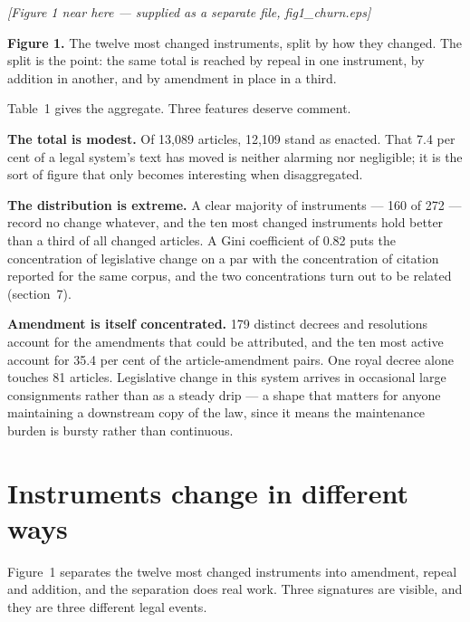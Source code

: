 \documentclass[11pt]{article}
\begin{document}
\bigskip
\noindent\textit{[Figure 1 near here --- supplied as a separate file, fig1\_churn.eps]}

\noindent\textbf{Figure 1.} The twelve most changed instruments, split by how they changed. The
split is the point: the same total is reached by repeal in one instrument, by
addition in another, and by amendment in place in a third.
\bigskip


Table~1 gives the aggregate. Three features deserve comment.

\textbf{The total is modest.} Of 13,089 articles, 12,109 stand as enacted.
That 7.4 per cent of a legal system's text has moved is neither alarming nor
negligible; it is the sort of figure that only becomes interesting when
disaggregated.

\textbf{The distribution is extreme.} A clear majority of instruments --- 160
of 272 --- record no change whatever, and the ten most changed instruments
hold better than a third of all changed articles. A Gini coefficient of 0.82
puts the concentration of legislative change on a par with the concentration
of citation reported for the same corpus, and the two concentrations turn out
to be related (section~7).

\textbf{Amendment is itself concentrated.} 179 distinct decrees and
resolutions account for the amendments that could be attributed, and the ten
most active account for 35.4 per cent of the article-amendment pairs. One
royal decree alone touches 81 articles. Legislative change in this system
arrives in occasional large consignments rather than as a steady drip --- a
shape that matters for anyone maintaining a downstream copy of the law, since
it means the maintenance burden is bursty rather than continuous.

\section{Instruments change in different ways}

Figure~1 separates the twelve most changed instruments into
amendment, repeal and addition, and the separation does real work. Three
signatures are visible, and they are three different legal events.
\end{document}
